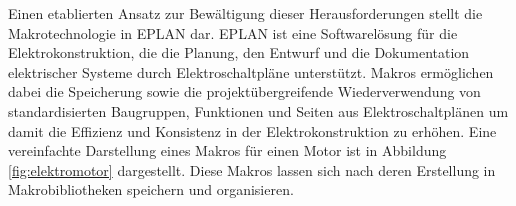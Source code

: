 Einen etablierten Ansatz zur Bewältigung dieser Herausforderungen stellt die Makrotechnologie in EPLAN dar. 
EPLAN ist eine Softwarelösung für die Elektrokonstruktion, die die Planung, den Entwurf und die Dokumentation elektrischer Systeme durch Elektroschaltpläne unterstützt.
Makros ermöglichen dabei die Speicherung sowie die projektübergreifende Wiederverwendung von standardisierten Baugruppen, Funktionen und Seiten aus Elektroschaltplänen um damit die Effizienz und Konsistenz in der Elektrokonstruktion zu erhöhen.
Eine vereinfachte Darstellung eines Makros für einen Motor ist in Abbildung \ref{fig:elektromotor} dargestellt. Diese Makros lassen sich nach deren Erstellung in Makrobibliotheken speichern und organisieren.
\parencite{EPLAN2022Makrobibliotheken}

\begin{figure}[H] 
    \centering 
\end{figure}
